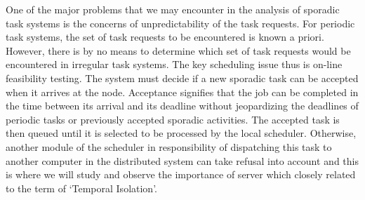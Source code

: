 One of the major problems that we may encounter in the analysis of sporadic task systems is the concerns of unpredictability of the task requests. For periodic task systems, the set of task requests to be encountered is known a priori. However, there is by no means to determine which set of task requests would be encountered in irregular task systems. The key scheduling issue thus is on-line feasibility testing.  The system must decide if a new sporadic task can be accepted when it arrives at the node. Acceptance signifies that the job can be completed in the time between its arrival and its deadline without jeopardizing the deadlines of periodic tasks or previously accepted sporadic activities. The accepted task is then queued until it is selected to be processed by the local scheduler. Otherwise, another module of the scheduler in responsibility of dispatching this task to another computer in the distributed system can take refusal into account \cite{b5} and this is where we will study and observe the importance of server which closely related to the term of ‘Temporal Isolation’.
